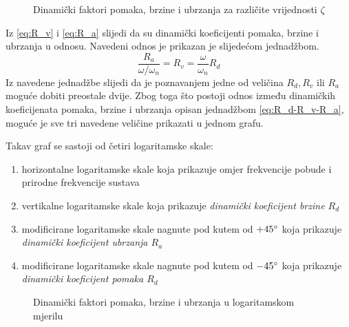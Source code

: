 \begin{figure}[H]
    
    \caption{Dinamički faktori pomaka, brzine i ubrzanja za različite vrijednosti
    $\zeta$}
    \label{fig:rd-rv-ra}
\end{figure}


Iz \eqref{eq:R_v} i \eqref{eq:R_a} slijedi da su dinamički koeficijenti pomaka,
brzine i ubrzanja u odnosu. Navedeni odnos je prikazan je slijedećom jednadžbom.
\begin{equation}\label{eq:R_d-R_v-R_a}
    \frac{R_a}{\omega/\omega_n}=R_v=\frac{\omega}{\omega_n}R_d 
\end{equation}
Iz navedene jednadžbe slijedi da je poznavanjem jedne od veličina $R_d, R_v 
\text{ ili } R_a$ moguće dobiti preostale dvije. Zbog toga što postoji odnos
između dinamičkih koeficijenata pomaka, brzine i ubrzanja opisan jednadžbom 
\eqref{eq:R_d-R_v-R_a}, moguće je sve tri navedene veličine prikazati u jednom
grafu.

Takav graf se sastoji od četiri logaritamske skale:
\begin{enumerate}
    \item horizontalne logaritamske skale koja prikazuje omjer frekvencije pobude i 
        prirodne frekvencije sustava 
    \item vertikalne logaritamske skale koja prikazuje \textit{dinamički koeficijent brzine
        $R_d$}
    \item modificirane logaritamske skale nagnute pod kutem od $+45\degree$ koja prikazuje
        \textit{dinamički koeficijent ubrzanja $R_a$}
    \item modificirane logaritamske skale nagnute pod kutem od $-45\degree$ koja prikazuje
        \textit{dinamički koeficijent pomaka $R_d$}
\end{enumerate}

\begin{figure}[H]
    
    \label{fig:dva-spektar}
    \caption{Dinamički faktori pomaka, brzine i ubrzanja u logaritamskom mjerilu}
\end{figure}


